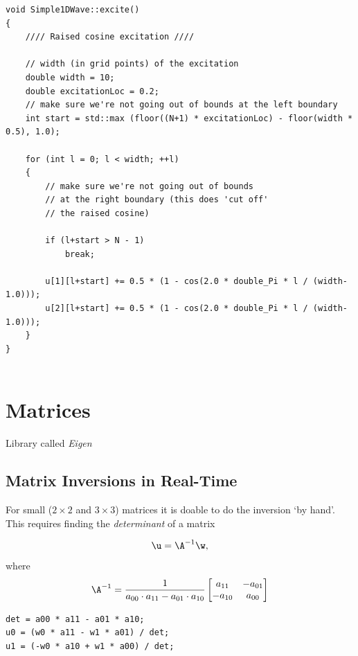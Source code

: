 \pagebreak
\begin{lstlisting}
void Simple1DWave::excite()
{
    //// Raised cosine excitation ////
    
    // width (in grid points) of the excitation
    double width = 10;
    double excitationLoc = 0.2;
    // make sure we're not going out of bounds at the left boundary
    int start = std::max (floor((N+1) * excitationLoc) - floor(width * 0.5), 1.0);
    
    for (int l = 0; l < width; ++l)
    {
        // make sure we're not going out of bounds
        // at the right boundary (this does 'cut off'
        // the raised cosine)
        
        if (l+start > N - 1)
            break;
        
        u[1][l+start] += 0.5 * (1 - cos(2.0 * double_Pi * l / (width-1.0)));
        u[2][l+start] += 0.5 * (1 - cos(2.0 * double_Pi * l / (width-1.0)));
    }
}
    
\end{lstlisting}


\section{Matrices}

Library called \textit{Eigen} \cite{Eigen}

\subsection{Matrix Inversions in Real-Time}\label{sec:RTmatrixInversion}
For small ($2\times 2$ and $3\times 3$) matrices it is doable to do the inversion `by hand'. This requires finding the \textit{determinant} of a matrix

\begin{equation*}
    \u = \A^{-1}\w, 
\end{equation*}
where
\begin{equation}
    \A^{-1} = \frac{1}{a_{00}\cdot a_{11} - a_{01}\cdot a_{10}}
    \begin{bmatrix}
        a_{11} & -a_{01}\\
        -a_{10} & a_{00} 
    \end{bmatrix}
\end{equation}

\setlstCpp
\begin{lstlisting}
det = a00 * a11 - a01 * a10;
u0 = (w0 * a11 - w1 * a01) / det;
u1 = (-w0 * a10 + w1 * a00) / det;
\end{lstlisting}